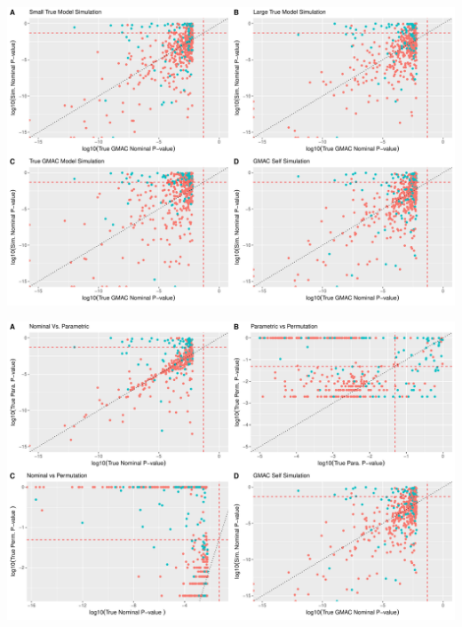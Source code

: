 \documentclass[
]{article}
\begin{document}
\includegraphics{12_15_2021_GMAC_plots_all_trios_files/figure-latex/unnamed-chunk-6-1.pdf}

\includegraphics{12_15_2021_GMAC_plots_all_trios_files/figure-latex/unnamed-chunk-7-1.pdf}
\end{document}
